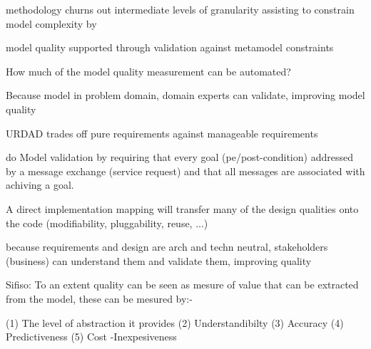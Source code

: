 methodology churns out intermediate levels of granularity assisting to constrain model complexity by 


model quality supported through validation against metamodel constraints

How much of the model quality measurement can be automated?

Because model in problem domain, domain experts can validate, improving model quality

URDAD trades off pure requirements against manageable requirements

\cite{graham_requirements_2008} do Model validation by requiring that every goal (pe/post-condition) addressed by a message exchange (service request) and that all messages are associated with achiving a goal.

A direct implementation mapping will transfer many of the design qualities onto the code (modifiability, pluggability, reuse, ...)

because requirements and design are arch and techn neutral, stakeholders (business) can understand them and validate them, improving quality


Sifiso:
To an extent quality can be seen as mesure of value that can be extracted from the model, these can be mesured by:-

(1) The level of abstraction it provides
(2) Understandibilty 
(3) Accuracy 
(4) Predictiveness
(5) Cost -Inexpesiveness 
\cite{selic_pragmatic_mdd_20003}
